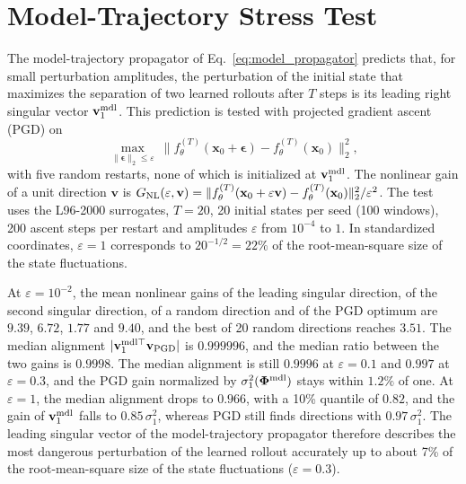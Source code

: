 \section{Model-Trajectory Stress Test}
\label{app:stress}

The model-trajectory propagator of Eq.~\eqref{eq:model_propagator} predicts that, for small perturbation amplitudes, the perturbation of the initial state that maximizes the separation of two learned rollouts after $T$ steps is its leading right singular vector $\mathbf v_1^{\rm mdl}$. This prediction is tested with projected gradient ascent (PGD) on
\begin{equation}
  \max_{\|\boldsymbol\epsilon\|_2\le\varepsilon}\ \big\|f_\theta^{(T)}(\mathbf x_0+\boldsymbol\epsilon)-f_\theta^{(T)}(\mathbf x_0)\big\|_2^2,
  \label{eq:pgd}
\end{equation}
with five random restarts, none of which is initialized at $\mathbf v_1^{\rm mdl}$. The nonlinear gain of a unit direction $\mathbf v$ is $G_{\rm NL}(\varepsilon,\mathbf v)=\|f_\theta^{(T)}(\mathbf x_0+\varepsilon\mathbf v)-f_\theta^{(T)}(\mathbf x_0)\|_2^2/\varepsilon^2$. The test uses the L96-2000 surrogates, $T=20$, 20 initial states per seed (100 windows), 200 ascent steps per restart and amplitudes $\varepsilon$ from $10^{-4}$ to $1$. In standardized coordinates, $\varepsilon=1$ corresponds to $20^{-1/2}=22\%$ of the root-mean-square size of the state fluctuations.

At $\varepsilon=10^{-2}$, the mean nonlinear gains of the leading singular direction, of the second singular direction, of a random direction and of the PGD optimum are $9.39$, $6.72$, $1.77$ and $9.40$, and the best of 20 random directions reaches $3.51$. The median alignment $|\mathbf v_1^{{\rm mdl}\top}\mathbf v_{\rm PGD}|$ is $0.999996$, and the median ratio between the two gains is $0.9998$. The median alignment is still $0.9996$ at $\varepsilon=0.1$ and $0.997$ at $\varepsilon=0.3$, and the PGD gain normalized by $\sigma_1^2(\boldsymbol{\Phi}^{\rm mdl})$ stays within $1.2\%$ of one. At $\varepsilon=1$, the median alignment drops to $0.966$, with a 10\% quantile of $0.82$, and the gain of $\mathbf v_1^{\rm mdl}$ falls to $0.85\,\sigma_1^2$, whereas PGD still finds directions with $0.97\,\sigma_1^2$. The leading singular vector of the model-trajectory propagator therefore describes the most dangerous perturbation of the learned rollout accurately up to about 7\% of the root-mean-square size of the state fluctuations ($\varepsilon=0.3$).
